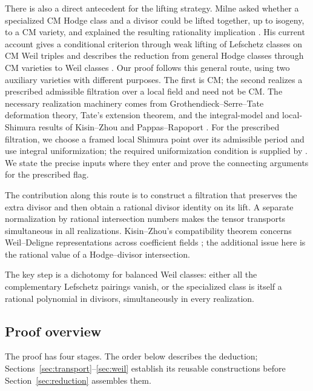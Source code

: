 There is also a direct antecedent for the lifting strategy. Milne asked
whether a specialized CM Hodge class and a divisor could be lifted
together, up to isogeny, to a CM variety, and explained the resulting
rationality implication \cite[Question~10.6 and Proposition~10.7]{MilneAIM2007}.
His current account gives a conditional criterion through weak lifting
of Lefschetz classes on CM Weil triples and describes the reduction
from general Hodge classes through CM varieties to Weil classes
\cite[Introduction, Question~2.17, and Theorem~2.18]{Milne2025}.
Our proof follows this general route, using two auxiliary varieties
with different purposes. The
first is CM; the second realizes a prescribed admissible filtration
over a local field and need not be CM. The necessary realization
machinery comes from Grothendieck--Serre--Tate deformation theory,
Tate's extension theorem, and the integral-model and local-Shimura
results of Kisin--Zhou and Pappas--Rapoport
\cite{Grothendieck1970,Tate1967,KisinZhou2025,PappasRapoport2024}.
For the prescribed filtration, we choose a framed local Shimura
point over its admissible period and use integral uniformization;
the required uniformization condition is supplied by
\cite[Corollary~6.3]{GleasonLimXu2026}. We state the precise inputs
where they enter and prove the connecting arguments for the
prescribed flag.

The contribution along this route is to construct a filtration that
preserves the extra divisor and then obtain a rational divisor identity
on its lift. A separate normalization by rational intersection numbers
makes the tensor transports simultaneous in all realizations.
Kisin--Zhou's compatibility theorem concerns Weil--Deligne
representations across coefficient fields
\cite[Theorem~1.2]{KisinZhou2025}; the additional issue here is the
rational value of a Hodge--divisor intersection.

The key step is a dichotomy for balanced Weil classes: either all the
complementary Lefschetz pairings vanish, or the specialized class is
itself a rational polynomial in divisors, simultaneously in every
realization.

\subsection{Proof overview}

The proof has four stages. The order below describes the deduction;
Sections~\ref{sec:transport}--\ref{sec:weil} establish its reusable
constructions before Section~\ref{sec:reduction} assembles them.

